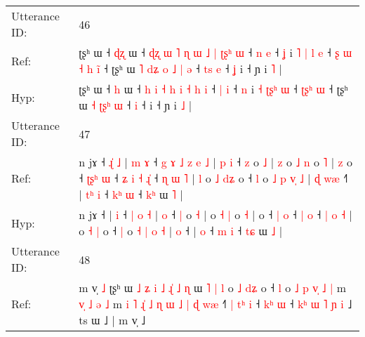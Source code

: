 \documentclass[10pt]{article}
\DeclareRobustCommand{\hl}[1]{{\textcolor{red}{#1}}}
\begin{document}
\begin{longtable}{ll}
 \\
\midrule
Utterance ID: & 46 \\
Ref: & ʈʂʰ ɯ ˧ \hl{ɖ}\hl{ʐ} ɯ ˧\hl{ }\hl{ɖ}\hl{ʐ} \hl{ɯ} \hl{˥} \hl{ɳ} \hl{ɯ} \hl{˩} \hl{|} \hl{ʈ}\hl{ʂ}\hl{ʰ} \hl{ɯ} ˧ \hl{n} \hl{e} ˧ \hl{ʝ} i \hl{˥} \hl{|}\hl{ }\hl{l} \hl{e} ˧\hl{ }\hl{ʂ}\hl{ }\hl{ɯ} \hl{˧}\hl{ }\hl{h} \hl{i}\hl{̃} ˧ ʈʂʰ ɯ\hl{ }\hl{˥}\hl{ }\hl{d}\hl{ʑ} \hl{o} \hl{˩}\hl{ }\hl{|} \hl{ə} ˧\hl{ }\hl{t}\hl{s} \hl{e} ˧\hl{ }\hl{ʝ} i ˧ ɲ i \hl{˥} |
 \\
Hyp: & ʈʂʰ ɯ ˧ \hl{}\hl{h} ɯ ˧\hl{}\hl{}\hl{} \hl{h} \hl{i} \hl{˧} \hl{h} \hl{i} \hl{˧} \hl{}\hl{}\hl{h} \hl{i} ˧ \hl{|} \hl{i} ˧ \hl{n} i \hl{˧} \hl{ʈ}\hl{ʂ}\hl{ʰ} \hl{ɯ} ˧\hl{}\hl{}\hl{}\hl{} \hl{ʈ}\hl{ʂ}\hl{ʰ} \hl{}\hl{ɯ} ˧ ʈʂʰ ɯ\hl{}\hl{}\hl{}\hl{}\hl{} \hl{˧} \hl{ʈ}\hl{ʂ}\hl{ʰ} \hl{ɯ} ˧\hl{}\hl{}\hl{} \hl{i} ˧\hl{}\hl{} i ˧ ɲ i \hl{˩} |
 \\
\midrule
Utterance ID: & 47 \\
Ref: & n jɤ ˧\hl{ }\hl{ɻ}\hl{̍}\hl{ }\hl{˩} |\hl{ }\hl{m} \hl{ɤ} ˧\hl{ }\hl{g}\hl{ }\hl{ɤ}\hl{ }\hl{˩} \hl{z} \hl{e} \hl{˩} |\hl{ }\hl{p} \hl{i} ˧ \hl{z} o \hl{˩} |\hl{ }\hl{z} o \hl{˩} \hl{n} o \hl{˥} |\hl{ }\hl{z} o ˧ \hl{ʈ}\hl{ʂ}\hl{ʰ} \hl{ɯ} ˧\hl{ }\hl{ʑ}\hl{ }\hl{i} \hl{˧} \hl{ɻ}\hl{̍} ˧ \hl{ɳ} \hl{ɯ} \hl{˥} |\hl{ }\hl{l} o \hl{˩} \hl{d}\hl{ʑ} o ˧ \hl{l} o \hl{˩} \hl{p} \hl{v}\hl{̩} \hl{˩} |\hl{ }\hl{ɖ} \hl{w}\hl{æ} ˧\hl{˥} |\hl{ }\hl{t}\hl{ʰ} \hl{i} ˧ \hl{k}\hl{ʰ} \hl{ɯ} ˧ \hl{k}\hl{ʰ} ɯ \hl{˥} |
 \\
Hyp: & n jɤ ˧\hl{}\hl{}\hl{}\hl{}\hl{} |\hl{}\hl{} \hl{i} ˧\hl{}\hl{}\hl{}\hl{}\hl{}\hl{} \hl{|} \hl{o} \hl{˧} |\hl{}\hl{} \hl{o} ˧ \hl{|} o \hl{˧} |\hl{}\hl{} o \hl{˧} \hl{|} o \hl{˧} |\hl{}\hl{} o ˧ \hl{}\hl{}\hl{|} \hl{o} ˧\hl{}\hl{}\hl{}\hl{} \hl{|} \hl{}\hl{o} ˧ \hl{|} \hl{o} \hl{˧} |\hl{}\hl{} o \hl{˧} \hl{}\hl{|} o ˧ \hl{|} o \hl{˧} \hl{|} \hl{}\hl{o} \hl{˧} |\hl{}\hl{} \hl{}\hl{o} ˧\hl{} |\hl{}\hl{}\hl{} \hl{o} ˧ \hl{}\hl{m} \hl{i} ˧ \hl{t}\hl{ɕ} ɯ \hl{˩} |
 \\
\midrule
Utterance ID: & 48 \\
Ref: & m v̩ \hl{˩} ʈʂʰ ɯ\hl{ }\hl{˩}\hl{ }\hl{ʑ}\hl{ }\hl{i}\hl{ }\hl{˩}\hl{ }\hl{ɻ}\hl{̍} \hl{˩} \hl{ɳ} ɯ\hl{ }\hl{˥} \hl{|} \hl{l} o \hl{˩} \hl{d}\hl{ʑ} o ˧ \hl{l} o\hl{ }\hl{˩}\hl{ }\hl{p}\hl{ }\hl{v}\hl{̩}\hl{ }\hl{˩} \hl{|} m\hl{ }\hl{v}\hl{̩}\hl{ }\hl{˩} \hl{ə} \hl{˩} m\hl{ }\hl{i}\hl{ }\hl{˥}\hl{ }\hl{ɻ}\hl{̍} \hl{˩} \hl{ɳ} \hl{ɯ} \hl{˩} \hl{|} \hl{ɖ} \hl{w}\hl{æ} ˧\hl{˥}\hl{ }\hl{|} \hl{t}\hl{ʰ} \hl{i} ˧ \hl{k}\hl{ʰ} \hl{ɯ} ˧ \hl{k}\hl{ʰ} \hl{ɯ} \hl{˥} \hl{ɲ} \hl{i} ˩ ts ɯ ˩ | m v̩ ˩

\end{longtable}
\end{document}
